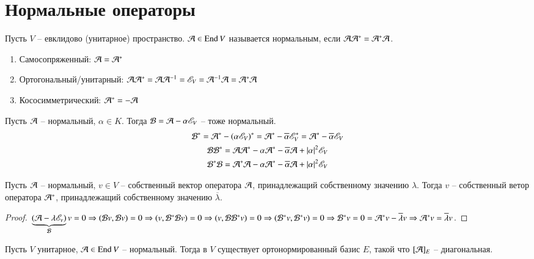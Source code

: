 \documentclass[main]{subfiles}
\begin{document}
\chapter{Нормальные операторы}

\begin{definition}
    Пусть $V$ -- евклидово (унитарное) пространство. $\mathcal{A} \in \operatorname{End} V$ называется нормальным, если
    $\mathcal{A} \mathcal{A}^* = \mathcal{A}^* \mathcal{A}$.
    \begin{enumerate}
        \item Самосопряженный: $\mathcal{A} = \mathcal{A}^*$
        \item Ортогональный/унитарный: $\mathcal{A} \mathcal{A}^* = \mathcal{A} \mathcal{A}^{-1} =\mathscr{E}_V = \mathcal{A}^{-1} \mathcal{A} = \mathcal{A}^* \mathcal{A}$
        \item Кососимметрический: $\mathcal{A}^* = -\mathcal{A}$
    \end{enumerate}
\end{definition}

\begin{proposition}
    Пусть $\mathcal{A}$ -- нормальный, $\alpha \in K$. Тогда $\mathcal{B} = \mathcal{A} - \alpha \mathscr{E}_V$ -- тоже нормальный.
    \begin{gather*}
        \mathcal{B}^* = \mathcal{A}^* - (\alpha \mathscr{E}_V)^* = \mathcal{A}^* - \overline{\alpha}\mathscr{E}_V^* = \mathcal{A}^* - \overline{\alpha}\mathscr{E}_V \\
        \mathcal{B} \mathcal{B}^* = \mathcal{A} \mathcal{A}^* - \alpha\mathcal{A}^* - \overline{\alpha}\mathcal{A} + |\alpha|^2\mathscr{E}_V \\
        \mathcal{B}^* \mathcal{B} = \mathcal{A}^* \mathcal{A} - \alpha \mathcal{A}^* - \overline{\alpha}\mathcal{A} + |\alpha|^2\mathscr{E}_V 
    \end{gather*}
\end{proposition}

\begin{proposition}
    Пусть $\mathcal{A}$ -- нормальный, $v \in V$ -- собственный вектор оператора $\mathcal{A}$, принадлежащий собственному значению $\lambda$. Тогда $v$ -- собственный ветор оператора $\mathcal{A}^*$, принадлежащий собственному значению $\overline{\lambda}$.
\end{proposition}

\begin{proof}
    $\underbrace{(\mathcal{A} - \lambda \mathscr{E}_v)}_{\mathcal{B}} v = 0 \Rightarrow (\mathcal{B} v, \mathcal{B} v) = 0 \Rightarrow
        (v, \mathcal{B}^* \mathcal{B} v) = 0 \Rightarrow (v, \mathcal{B} \mathcal{B}^* v) = 0 \Rightarrow (\mathcal{B}^* v, \mathcal{B}^* v) = 0 \Rightarrow \mathcal{B}^*v = 0 = \mathcal{A}^* v - \overline{\lambda}v \Rightarrow \mathcal{A}^*v = \overline{\lambda}v$.
\end{proof}

\begin{theorem} 
    Пусть $V$ унитарное, $\mathcal{A} \in \operatorname{End} V$ -- нормальный. Тогда в $V$ существует ортонормированный базис $E$, такой что $[\mathcal{A}]_E$ -- диагональная.
\end{theorem}
\end{document}
